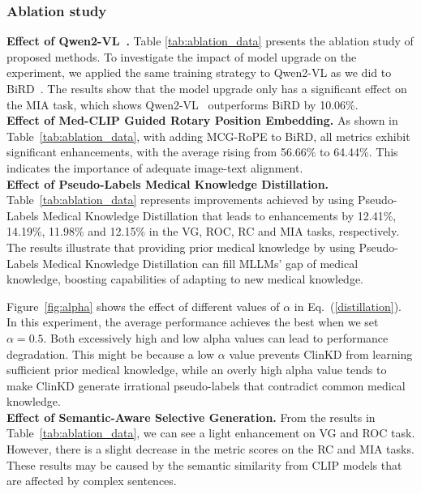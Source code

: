 \subsubsection{Ablation study}

\textbf{Effect of Qwen2-VL~\cite{wang2024qwen2vlenhancingvisionlanguagemodels}.} Table \ref{tab:ablation_data} presents the ablation study of  proposed methods. To investigate the impact of model upgrade on the experiment, we applied the same training strategy to Qwen2-VL as we did to BiRD~\cite{huang2024BiRD}. The results show that the model upgrade only has a significant effect on the MIA task, which shows Qwen2-VL~\cite{wang2024qwen2vlenhancingvisionlanguagemodels} outperforms BiRD by 10.06\%.\\
\textbf{Effect of Med-CLIP Guided Rotary Position Embedding.} As shown in Table~\ref{tab:ablation_data}, with adding MCG-RoPE to BiRD, all metrics exhibit significant enhancements, with the average rising from 56.66\% to 64.44\%. This indicates the importance of adequate image-text alignment.\\
\textbf{Effect of Pseudo-Labels Medical Knowledge Distillation.} Table~\ref{tab:ablation_data} represents improvements achieved by using Pseudo-Labels Medical Knowledge Distillation that leads to enhancements by 12.41\%, 14.19\%, 11.98\% and 12.15\% in the VG, ROC, RC and MIA tasks, respectively. The results illustrate that providing prior medical knowledge by using Pseudo-Labels Medical Knowledge Distillation can fill MLLMs' gap of medical knowledge, boosting capabilities of adapting to new medical knowledge.

Figure~\ref{fig:alpha} shows the effect of different values of $\alpha$ in Eq.~(\ref{distillation}). In this experiment, the average performance achieves the best when we set $\alpha=0.5$. Both excessively high and low alpha values can lead to performance degradation. This might be because a low $\alpha$ value prevents ClinKD from learning sufficient prior medical knowledge, while an overly high alpha value tends to make ClinKD generate irrational pseudo-labels that contradict common medical knowledge.\\
\textbf{Effect of Semantic-Aware Selective Generation.} From the results in Table~\ref{tab:ablation_data}, we can see a light enhancement on VG and ROC task. However, there is a slight decrease in the metric scores on the RC and MIA tasks. These results may be caused by the semantic similarity from CLIP models that are affected by complex sentences.

